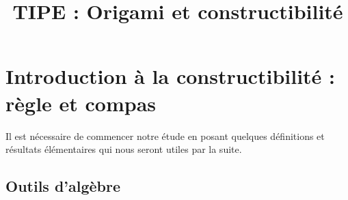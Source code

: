\documentclass[a4paper,12pt,french,draft]{report}
\title{TIPE : Origami et constructibilité}
\begin{document}
\newtheorem*{remarque}{Remarque}
\maketitle
\renewcommand{\contentsname}{Sommaire}
\tableofcontents{}


\chapter{Introduction à la constructibilité : règle et compas}
		Il est nécessaire de commencer notre étude en posant quelques définitions et résultats élémentaires qui nous seront utiles par la suite.

		\section{Outils d'algèbre}
			
\end{document}
